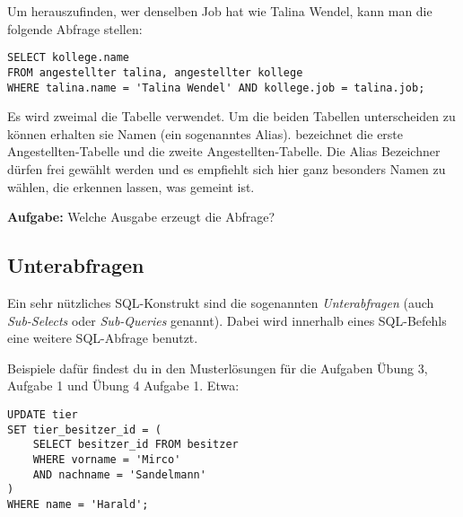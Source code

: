 Um herauszufinden, wer denselben Job hat wie Talina Wendel, kann man die folgende Abfrage stellen:

\begin{lstlisting}
SELECT kollege.name
FROM angestellter talina, angestellter kollege
WHERE talina.name = 'Talina Wendel' AND kollege.job = talina.job;
\end{lstlisting}

Es wird zweimal die Tabelle  verwendet. Um die beiden
Tabellen unterscheiden zu können erhalten sie Namen (ein sogenanntes Alias).
 bezeichnet die erste Angestellten-Tabelle und
 die zweite Angestellten-Tabelle. Die Alias Bezeichner
dürfen frei gewählt werden und es empfiehlt sich hier ganz besonders Namen zu
wählen, die erkennen lassen, was gemeint ist.

\textbf{Aufgabe:} Welche Ausgabe erzeugt die Abfrage?


\subsection{Unterabfragen}

Ein sehr nützliches SQL-Konstrukt sind die sogenannten \emph{Unterabfragen}
(auch \emph{Sub-Selects} oder \emph{Sub-Queries} genannt). Dabei wird
innerhalb eines SQL-Befehls eine weitere SQL-Abfrage benutzt.

Beispiele dafür findest du in den Musterlösungen für die Aufgaben Übung 3,
Aufgabe 1 und Übung 4 Aufgabe 1. Etwa:

\begin{lstlisting}
UPDATE tier
SET tier_besitzer_id = (
    SELECT besitzer_id FROM besitzer
    WHERE vorname = 'Mirco'
    AND nachname = 'Sandelmann'
)
WHERE name = 'Harald';
\end{lstlisting}
